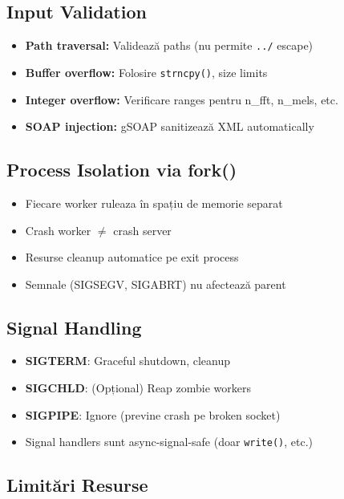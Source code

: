 \documentclass[12pt,a4paper,twoside]{article}
\begin{document}
\begin{itemize}
\subsection{Input Validation}

\begin{itemize}
    \item \textbf{Path traversal:} Validează paths (nu permite \texttt{../} escape)
    \item \textbf{Buffer overflow:} Folosire \texttt{strncpy()}, size limits
    \item \textbf{Integer overflow:} Verificare ranges pentru n\_fft, n\_mels, etc.
    \item \textbf{SOAP injection:} gSOAP sanitizează XML automatically
\end{itemize}

\subsection{Process Isolation via fork()}

\begin{itemize}
    \item Fiecare worker ruleaza în spațiu de memorie separat
    \item Crash worker $\neq$ crash server
    \item Resurse cleanup automatice pe exit process
    \item Semnale (SIGSEGV, SIGABRT) nu afectează parent
\end{itemize}

\subsection{Signal Handling}

\begin{itemize}
    \item \textbf{SIGTERM}: Graceful shutdown, cleanup
    \item \textbf{SIGCHLD}: (Opțional) Reap zombie workers
    \item \textbf{SIGPIPE}: Ignore (previne crash pe broken socket)
    \item Signal handlers sunt async-signal-safe (doar \texttt{write()}, etc.)
\end{itemize}

\subsection{Limitări Resurse}


\end{itemize}
\end{document}
